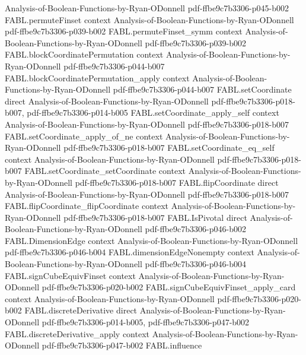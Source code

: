 \begin{theorem}
  {Analysis-of-Boolean-Functions-by-Ryan-ODonnell}
  {pdf-ffbe9c7b3306-p045-b002}
\proofstep
  {FABL.permuteFinset}
  {context}
  {Analysis-of-Boolean-Functions-by-Ryan-ODonnell}
  {pdf-ffbe9c7b3306-p039-b002}
\proofstep
  {FABL.permuteFinset_symm}
  {context}
  {Analysis-of-Boolean-Functions-by-Ryan-ODonnell}
  {pdf-ffbe9c7b3306-p039-b002}
\proofstep
  {FABL.blockCoordinatePermutation}
  {context}
  {Analysis-of-Boolean-Functions-by-Ryan-ODonnell}
  {pdf-ffbe9c7b3306-p044-b007}
\proofstep
  {FABL.blockCoordinatePermutation_apply}
  {context}
  {Analysis-of-Boolean-Functions-by-Ryan-ODonnell}
  {pdf-ffbe9c7b3306-p044-b007}
\proofstep
  {FABL.setCoordinate}
  {direct}
  {Analysis-of-Boolean-Functions-by-Ryan-ODonnell}
  {pdf-ffbe9c7b3306-p018-b007,
    pdf-ffbe9c7b3306-p014-b005}
\proofstep
  {FABL.setCoordinate_apply_self}
  {context}
  {Analysis-of-Boolean-Functions-by-Ryan-ODonnell}
  {pdf-ffbe9c7b3306-p018-b007}
\proofstep
  {FABL.setCoordinate_apply_of_ne}
  {context}
  {Analysis-of-Boolean-Functions-by-Ryan-ODonnell}
  {pdf-ffbe9c7b3306-p018-b007}
\proofstep
  {FABL.setCoordinate_eq_self}
  {context}
  {Analysis-of-Boolean-Functions-by-Ryan-ODonnell}
  {pdf-ffbe9c7b3306-p018-b007}
\proofstep
  {FABL.setCoordinate_setCoordinate}
  {context}
  {Analysis-of-Boolean-Functions-by-Ryan-ODonnell}
  {pdf-ffbe9c7b3306-p018-b007}
\proofstep
  {FABL.flipCoordinate}
  {direct}
  {Analysis-of-Boolean-Functions-by-Ryan-ODonnell}
  {pdf-ffbe9c7b3306-p018-b007}
\proofstep
  {FABL.flipCoordinate_flipCoordinate}
  {context}
  {Analysis-of-Boolean-Functions-by-Ryan-ODonnell}
  {pdf-ffbe9c7b3306-p018-b007}
\proofstep
  {FABL.IsPivotal}
  {direct}
  {Analysis-of-Boolean-Functions-by-Ryan-ODonnell}
  {pdf-ffbe9c7b3306-p046-b002}
\proofstep
  {FABL.DimensionEdge}
  {context}
  {Analysis-of-Boolean-Functions-by-Ryan-ODonnell}
  {pdf-ffbe9c7b3306-p046-b004}
\proofstep
  {FABL.dimensionEdgeNonempty}
  {context}
  {Analysis-of-Boolean-Functions-by-Ryan-ODonnell}
  {pdf-ffbe9c7b3306-p046-b004}
\proofstep
  {FABL.signCubeEquivFinset}
  {context}
  {Analysis-of-Boolean-Functions-by-Ryan-ODonnell}
  {pdf-ffbe9c7b3306-p020-b002}
\proofstep
  {FABL.signCubeEquivFinset_apply_card}
  {context}
  {Analysis-of-Boolean-Functions-by-Ryan-ODonnell}
  {pdf-ffbe9c7b3306-p020-b002}
\proofstep
  {FABL.discreteDerivative}
  {direct}
  {Analysis-of-Boolean-Functions-by-Ryan-ODonnell}
  {pdf-ffbe9c7b3306-p014-b005,
    pdf-ffbe9c7b3306-p047-b002}
\proofstep
  {FABL.discreteDerivative_apply}
  {context}
  {Analysis-of-Boolean-Functions-by-Ryan-ODonnell}
  {pdf-ffbe9c7b3306-p047-b002}
\proofstep
  {FABL.influence}

\end{theorem}
